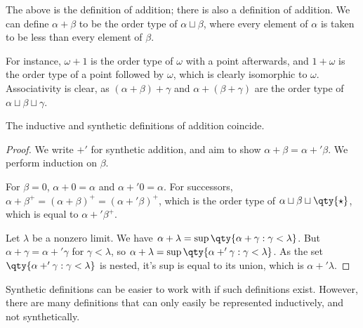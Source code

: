 The above is the  definition of addition; there is also a  definition of addition.
We can define $\alpha + \beta$ to be the order type of $\alpha \sqcup \beta$, where every element of $\alpha$ is taken to be less than every element of $\beta$.

For instance, $\omega + 1$ is the order type of $\omega$ with a point afterwards, and $1 + \omega$ is the order type of a point followed by $\omega$, which is clearly isomorphic to $\omega$.
Associativity is clear, as $(\alpha + \beta) + \gamma$ and $\alpha + (\beta + \gamma)$ are the order type of $\alpha \sqcup \beta \sqcup \gamma$.
\begin{proposition}
    The inductive and synthetic definitions of addition coincide.
\end{proposition}
\begin{proof}
    We write $+'$ for synthetic addition, and aim to show $\alpha + \beta = \alpha +' \beta$.
    We perform induction on $\beta$.

    For $\beta = 0$, $\alpha + 0 = \alpha$ and $\alpha +' 0 = \alpha$.
    For successors, $\alpha + \beta^+ = (\alpha + \beta)^+ = (\alpha +' \beta)^+$, which is the order type of $\alpha \sqcup \beta \sqcup \qty{\star}$, which is equal to $\alpha +' \beta^+$.

    Let $\lambda$ be a nonzero limit.
    We have $\alpha + \lambda = \sup\qty{\alpha + \gamma : \gamma < \lambda}$.
    But $\alpha + \gamma = \alpha +' \gamma$ for $\gamma < \lambda$, so $\alpha + \lambda = \sup\qty{\alpha +' \gamma : \gamma < \lambda}$.
    As the set $\qty{\alpha +' \gamma : \gamma < \lambda}$ is nested, it's sup is equal to its union, which is $\alpha +' \lambda$.
\end{proof}
Synthetic definitions can be easier to work with if such definitions exist.
However, there are many definitions that can only easily be represented inductively, and not synthetically.

